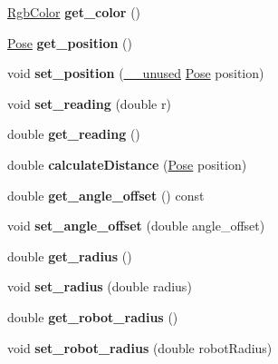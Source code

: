 \begin{DoxyCompactItemize}
\item 
\hyperlink{structRgbColor}{Rgb\+Color} {\bfseries get\+\_\+color} ()\hypertarget{classSensor_a32cdb478a4b0a8756e6b64dcc19d0f44}{}\label{classSensor_a32cdb478a4b0a8756e6b64dcc19d0f44}

\item 
\hyperlink{structPose}{Pose} {\bfseries get\+\_\+position} ()\hypertarget{classSensor_ab4b069b6604c7ca78768eb2e7641cfec}{}\label{classSensor_ab4b069b6604c7ca78768eb2e7641cfec}

\item 
void {\bfseries set\+\_\+position} (\hyperlink{common_8h_a2e3484535ee610c8e19e9859563abe48}{\+\_\+\+\_\+unused} \hyperlink{structPose}{Pose} position)\hypertarget{classSensor_a8f63f096c5b15dfc7e047198b00b98dc}{}\label{classSensor_a8f63f096c5b15dfc7e047198b00b98dc}

\item 
void {\bfseries set\+\_\+reading} (double r)\hypertarget{classSensor_a3a58b2a35eee78207178405ce0059ec1}{}\label{classSensor_a3a58b2a35eee78207178405ce0059ec1}

\item 
double {\bfseries get\+\_\+reading} ()\hypertarget{classSensor_a5276b83e9c880ef379fe9b08293e61cf}{}\label{classSensor_a5276b83e9c880ef379fe9b08293e61cf}

\item 
double {\bfseries calculate\+Distance} (\hyperlink{structPose}{Pose} position)\hypertarget{classSensor_a3937770f2eca52aeae5dc4729a67964d}{}\label{classSensor_a3937770f2eca52aeae5dc4729a67964d}

\item 
double {\bfseries get\+\_\+angle\+\_\+offset} () const \hypertarget{classSensor_a362dc3c306e44d50973ddf6a8f97bfff}{}\label{classSensor_a362dc3c306e44d50973ddf6a8f97bfff}

\item 
void {\bfseries set\+\_\+angle\+\_\+offset} (double angle\+\_\+offset)\hypertarget{classSensor_af528562ec7ea6fbc5387a790ddbc0bfa}{}\label{classSensor_af528562ec7ea6fbc5387a790ddbc0bfa}

\item 
double {\bfseries get\+\_\+radius} ()\hypertarget{classSensor_a6c2c71528658c45385e22ee97dc9b0f5}{}\label{classSensor_a6c2c71528658c45385e22ee97dc9b0f5}

\item 
void {\bfseries set\+\_\+radius} (double radius)\hypertarget{classSensor_a74578f3ec9a9c6e210789b207af2089e}{}\label{classSensor_a74578f3ec9a9c6e210789b207af2089e}

\item 
double {\bfseries get\+\_\+robot\+\_\+radius} ()\hypertarget{classSensor_afbf05731d0e64de8a98c5b15910ac827}{}\label{classSensor_afbf05731d0e64de8a98c5b15910ac827}

\item 
void {\bfseries set\+\_\+robot\+\_\+radius} (double robot\+Radius)\hypertarget{classSensor_a4e28f86507f08f3e6c5d16f16c9ff66b}{}\label{classSensor_a4e28f86507f08f3e6c5d16f16c9ff66b}

\end{DoxyCompactItemize}
